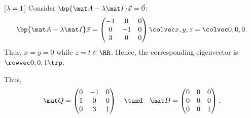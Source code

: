 \begin{solution}
\begin{ppart}
        [$\lambda = 1$] Consider $\bp{\mat A - \l \mat I} \vec x = \vec 0$: \[\bp{\mat A - \l \mat I} \vec x = \begin{pmatrix}-1 & 0 & 0 \\ 0 & -1 & 0 \\ 3 & 0 & 0\end{pmatrix}\cveciii{x}{y}{z} = \cveciii000.\] Thus, $x = y = 0$ while $z = t \in \RR$. Hence, the corresponding eigenvector is $\cveciiix001$.

        Thus, \[\mat Q = \begin{pmatrix}0 & -1 & 0 \\ 1 & 0 & 0 \\ 0 & 3 & 1\end{pmatrix} \quad \tand \quad \mat D = \begin{pmatrix}0 & 0 & 0 \\ 0 & 0 & 0 \\ 0 & 0 & 1\end{pmatrix}.\]
    \end{ppart}
\end{solution}


